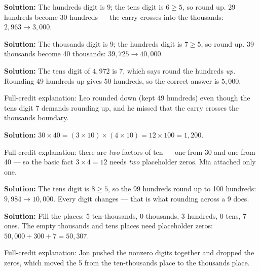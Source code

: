 \documentclass[12pt]{article}
\begin{document}



\textbf{Solution:} The hundreds digit is 9; the tens digit is $6 \geq 5$, so
round up. 29 hundreds become 30 hundreds — the carry crosses into the
thousands: $2{,}963 \rightarrow 3{,}000$. 


\textbf{Solution:} The thousands digit is 9; the hundreds digit is $7 \geq 5$,
so round up. 39 thousands become 40 thousands: $39{,}725 \rightarrow 40{,}000$.


\textbf{Solution:} The tens digit of $4{,}972$ is 7, which says round the
hundreds \emph{up}. Rounding 49 hundreds up gives 50 hundreds, so the correct
answer is $5{,}000$. 

Full-credit explanation: Leo rounded down (kept 49 hundreds) even though the
tens digit 7 demands rounding up, and he missed that the carry crosses the
thousands boundary.


\textbf{Solution:} $30 \times 40 = (3 \times 10) \times (4 \times 10) =
12 \times 100 = 1{,}200$. 

Full-credit explanation: there are \emph{two} factors of ten — one from 30 and
one from 40 — so the basic fact $3 \times 4 = 12$ needs \emph{two} placeholder
zeros. Mia attached only one.


\textbf{Solution:} The tens digit is $8 \geq 5$, so the 99 hundreds round up to
100 hundreds: $9{,}984 \rightarrow 10{,}000$. Every digit changes — that is
what rounding across a 9 does. 


\textbf{Solution:} Fill the places: 5 ten-thousands, 0 thousands, 3 hundreds,
0 tens, 7 ones. The empty thousands and tens places need placeholder zeros:
$50{,}000 + 300 + 7 = 50{,}307$. 

Full-credit explanation: Jon pushed the nonzero digits together and dropped the
zeros, which moved the 5 from the ten-thousands place to the thousands place.
\end{document}
